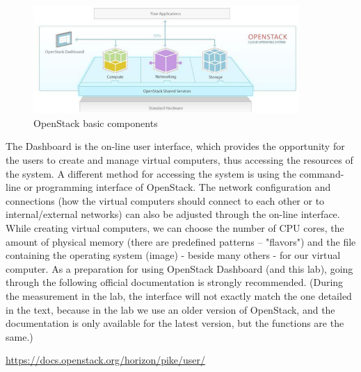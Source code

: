 \documentclass[a4paper]{article}
\begin{document}
\begin{figure}[H]
    \centering
    \includegraphics[width=0.9\textwidth]{figures/components.png}
    \caption{OpenStack basic components}
    \label{fig:oscomponents}
\end{figure}

The Dashboard is the on-line user interface, which provides the opportunity for the users to create and manage virtual
computers, thus accessing the resources of the system. A different method for accessing the system is using the
command-line or programming interface of OpenStack. The network configuration and connections (how the virtual
computers should connect to each other or to internal/external networks) can also be adjusted through the on-line
interface. While creating virtual computers, we can choose the number of CPU cores, the amount of physical memory
(there are predefined patterns – "flavors") and the file containing the operating system (image) - beside many others -
for our virtual computer.
As a preparation for using OpenStack Dashboard (and this lab), going through the following official documentation is
strongly recommended.
(During the measurement in the lab, the interface will not exactly match the one detailed in the text, because in the
lab we use an older version of OpenStack, and the documentation is only available for the latest version, but the
functions are the same.)

\url{https://docs.openstack.org/horizon/pike/user/}
\end{document}
